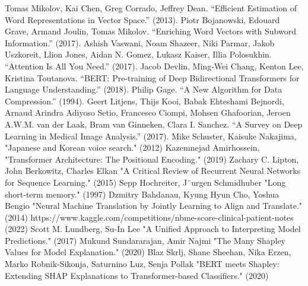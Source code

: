 \begin{thebibliography}{}
     Tomas Mikolov, Kai Chen, Greg Corrado, Jeffrey Dean. “Efficient Estimation of Word Representations in Vector Space.” (2013).
     Piotr Bojanowski, Edouard Grave, Armand Joulin, Tomas Mikolov. “Enriching Word Vectors with Subword Information.” (2017).
     Ashish Vaswani, Noam Shazeer, Niki Parmar, Jakob Uszkoreit, Llion Jones, Aidan N. Gomez, Lukasz Kaiser, Illia Polosukhin. “Attention Is All You Need.” (2017).
     Jacob Devlin, Ming-Wei Chang, Kenton Lee, Kristina Toutanova. “BERT: Pre-training of Deep Bidirectional Transformers for Language Understanding.” (2018).
     Philip Gage. “A New Algorithm for Data Compression.” (1994).
     Geert Litjens, Thijs Kooi, Babak Ehteshami Bejnordi, Arnaud Arindra Adiyoso Setio, Francesco Ciompi, Mohsen Ghafoorian, Jeroen A.W.M. van der Laak, Bram van Ginneken, Clara I. Sanchez. “A Survey on Deep Learning in Medical Image Analysis.” (2017).
     Mike Schuster, Kaisuke Nakajima, "Japanese and Korean voice search." (2012)
     Kazemnejad Amirhossein, "Transformer Architecture: The Positional Encoding." (2019)
     Zachary C. Lipton, John Berkowitz, Charles Elkan "A Critical Review of Recurrent Neural Networks for Sequence Learning." (2015)
     Sepp Hochreiter, J¨urgen Schmidhuber "Long short-term memory." (1997)
     Dzmitry Bahdanau, Kyung Hyun Cho, Yoshua Bengio "Neural Machine Translation by Jointly Learning to Align and Translate." (2014)
     https://www.kaggle.com/competitions/nbme-score-clinical-patient-notes (2022)
     Scott M. Lundberg, Su-In Lee "A Unified Approach to Interpreting Model Predictions." (2017)
     Mukund Sundararajan, Amir Najmi "The Many Shapley Values for Model Explanation." (2020)
     Blaz Skrlj, Shane Sheehan, Nika Erzen, Marko Robnik-Sikonja, Saturnino Luz, Senja Pollak "BERT meets Shapley: Extending SHAP Explanations to Transformer-based Classifiers." (2020)
\end{thebibliography}
